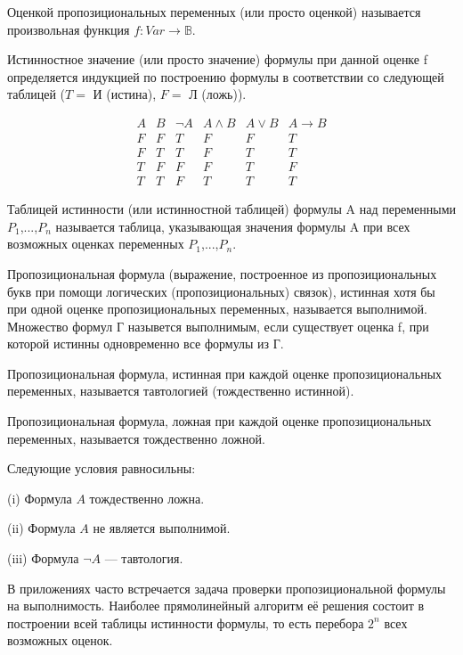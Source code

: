 \begin{definition}
	Оценкой пропозициональных переменных (или просто оценкой) называется произвольная функция $f: Var \to \mathbb{B}$.
\end{definition}

\begin{definition}
	Истинностное значение (или просто значение) формулы при данной оценке f определяется индукцией по построению
	формулы в соответствии со следующей таблицей ($T =$ И (истина), $F =$ Л (ложь)).

	$$
	\begin{array}{cc|c|c|c|c}
		{A} & {B} & {\neg A} & {A \wedge B} & {A \vee B} & {A \rightarrow B} \\
		\hline F & F & T & F & F & T \\
		F & T & T & F & T & T \\
		T & F & F & F & T & F \\
		T & T & F & T & T & T 
	\end{array}
	$$

\end{definition}

\begin{definition}
	Таблицей истинности (или истинностной таблицей) формулы A над переменными $P_1$,...,$P_n$ называется таблица,
	указывающая значения формулы A при всех возможных оценках переменных $P_1$,...,$P_n$.
\end{definition}

\begin{definition}
	Пропозициональная формула (выражение, построенное из пропозициональных букв при помощи логических
	(пропозициональных) связок), истинная хотя бы при одной оценке пропозициональных переменных, называется
	выполнимой. Множество формул Г назывется выполнимым, если существует оценка f, при которой истинны одновременно
	все формулы из Г.
\end{definition}

\begin{definition}
	Пропозициональная формула, истинная при каждой оценке пропозициональных переменных, называется тавтологией
	(тождественно истинной).
\end{definition}

\begin{definition}
	Пропозициональная формула, ложная при каждой
	оценке пропозициональных переменных, называется тождественно ложной.
\end{definition}

\begin{proposition}
	Следующие условия равносильны:

	(i) Формула $A$ тождественно ложна.

	(ii) Формула $A$ не является выполнимой.

	(iii) Формула $\lnot A$ — тавтология.
\end{proposition}

\begin{definition}
	В приложениях часто встречается задача проверки пропозициональной формулы на выполнимость. Наиболее
	прямолинейный алгоритм её решения состоит в построении всей таблицы истинности формулы, то есть перебора $2^n$
	всех возможных оценок.
\end{definition}
